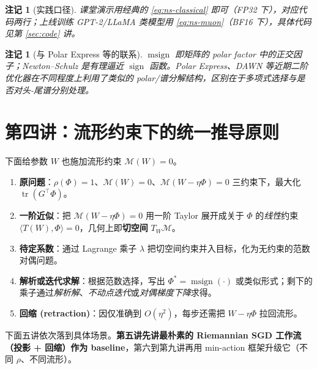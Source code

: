 \documentclass[11pt,a4paper]{article}
\theoremstyle{mythm}
\theoremstyle{mydef}
\newtheorem{remark}[theorem]{注记}
\newcommand{\tr}{\operatorname{tr}}
\newcommand{\sign}{\operatorname{sign}}
\newcommand{\msign}{\operatorname{msign}}
\newcommand{\inner}[2]{\langle #1, #2 \rangle}
\begin{document}
\begin{remark}[实践口径]
课堂演示用经典的 \eqref{eq:ns-classical} 即可（FP32 下），对应代码两行；上线训练 GPT-2/LLaMA 类模型用 \eqref{eq:ns-muon}（BF16 下），具体代码见第 \ref{sec:code} 讲。
\end{remark}

\begin{remark}[与 Polar Express 等的联系]
$\msign$ 即矩阵的 polar factor 中的正交因子；Newton--Schulz 是有理逼近 $\sign$ 函数。Polar Express、DAWN 等近期二阶优化器在不同程度上利用了类似的 polar/谱分解结构，区别在于多项式选择与是否对头-尾谱分别处理。
\end{remark}

\section{第四讲：流形约束下的统一推导原则}\label{sec:lin-approx}

下面给参数 $W$ 也施加流形约束 $\mathcal{M}(W) = 0$。

\begin{tcolorbox}[colback=blue!3,colframe=blue!50!black,title=\textbf{统一推导套路}]
\begin{enumerate}[leftmargin=2em]
    \item \textbf{原问题}：$\rho(\Phi)=1$、$\mathcal{M}(W)=0$、$\mathcal{M}(W-\eta\Phi)=0$ 三约束下，最大化 $\tr(G^\top \Phi)$。
    \item \textbf{一阶近似}：把 $\mathcal{M}(W-\eta\Phi)=0$ 用一阶 Taylor 展开成关于 $\Phi$ 的\emph{线性}约束 $\inner{T(W)}{\Phi}=0$，几何上即\textbf{切空间} $T_W\mathcal{M}$。
    \item \textbf{待定系数}：通过 Lagrange 乘子 $\lambda$ 把切空间约束并入目标，化为无约束的范数对偶问题。
    \item \textbf{解析或迭代求解}：根据范数选择，写出 $\Phi^\ast = \msign(\cdot)$ 或类似形式；剩下的乘子通过\emph{解析解}、\emph{不动点迭代}或\emph{对偶梯度下降}求得。
    \item \textbf{回缩 (retraction)}：因仅准确到 $O(\eta^2)$，每步还需把 $W-\eta\Phi$ 拉回流形。
\end{enumerate}
\end{tcolorbox}

下面五讲依次落到具体场景。\textbf{第五讲先讲最朴素的 Riemannian SGD 工作流（投影 + 回缩）作为 baseline}，第六到第九讲再用 min-action 框架升级它（不同 $\rho$、不同流形）。
\end{document}
